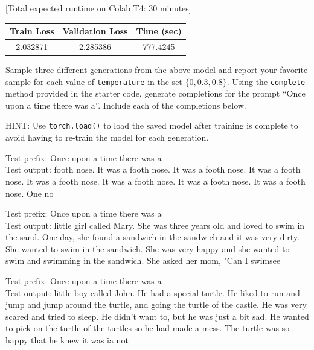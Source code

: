 \documentclass[11pt,addpoints,answers]{exam}
\begin{document}
\begin{questions}
\begin{parts}
\begin{subparts}
    {[}Total expected runtime on Colab T4: 30 minutes{]} \\
    
    \begin{center}
        \begin{tabular}{c|c|c}
            \toprule
            {\bf Train Loss}   & {\bf Validation Loss} & {\bf Time (sec)} \\
            \midrule
               2.032871 & 2.285386  &  777.4245 \\
            \bottomrule
        \end{tabular}
    \end{center} 
    


    \subpart[3] Sample three different generations from the above model and report your favorite sample for each value of \texttt{temperature} in the set $\{0, 0.3, 0.8\}$. Using the \texttt{complete} method provided in the starter code, generate completions for the prompt ``Once upon a time there was a''. Include each of the completions below. 

    HINT: Use \texttt{torch.load()} to load the saved model after training is complete to avoid having to re-train the model for each generation.
    
    \begin{your_solution}[title=\texttt{Temperature = 0}, height=3cm]
        \small
        Test prefix: Once upon a time there was a \\
        Test output: footh nose. It was a footh nose. It was a footh nose. It was a footh nose. It was a footh nose. It was a footh nose. It was a footh nose. It was a footh nose. One no
    \end{your_solution}
    
    \begin{your_solution}[title=\texttt{Temperature = 0.3}, height=3cm]
        \small
		Test prefix: Once upon a time there was a \\
		Test output: little girl called Mary. She was three years old and loved to swim in the sand. One day, she found a sandwich in the sandwich and it was very dirty. She wanted to swim in the sandwich. She was very happy and she wanted to swim and swimming in the sandwich. She asked her mom, "Can I swimsee        
    \end{your_solution}
    
    \begin{your_solution}[title=\texttt{Temperature = 0.8}, height=3cm]
        \small
		Test prefix: Once upon a time there was a \\
		Test output: little boy called John. He had a special turtle. He liked to run and jump and jump around the turtle, and going the turtle of the castle. He was very scared and tried to sleep. He didn't want to, but he was just a bit sad. He wanted to pick on the turtle of the turtles so he had made a mess. The turtle was so happy that he knew it was ia not
    \end{your_solution}



\end{subparts}
\end{parts}
\end{questions}
\end{document}
